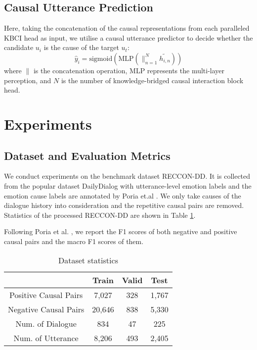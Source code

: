 \documentclass[letterpaper]{article} \usepackage{aaai23}  \usepackage{times}  \usepackage{helvet}  \usepackage{courier}  \usepackage[hyphens]{url}  \usepackage{graphicx} \urlstyle{rm} \def\UrlFont{\rm}  \usepackage{natbib}  \usepackage{caption} \frenchspacing  \setlength{\pdfpagewidth}{8.5in} \setlength{\pdfpageheight}{11in} \usepackage{algorithm}
\begin{document}
\subsection{Causal Utterance Prediction}
Here, taking the concatenation of the causal representations from each paralleled KBCI head as input, we utilise a causal utterance predictor to decide whether the candidate $u_i$ is the cause of the target $u_t$:
\begin{equation}
    \hat{y}_i = \mathrm{sigmoid}(\mathrm{MLP}(\parallel_{n=1}^N \tilde{h_{i,n}}))
\end{equation}
where $\parallel$ is the concatenation operation, MLP represents the multi-layer perception, and $N$ is the number of knowledge-bridged causal interaction block head.

\section{Experiments}
\subsection{Dataset and Evaluation Metrics}
We conduct experiments on the benchmark dataset RECCON-DD. It is collected from the popular dataset DailyDialog \cite{dd} with utterance-level emotion labels and the emotion cause labels are annotated by Poria et.al . We only take causes of the dialogue history into consideration and the repetitive causal pairs are removed. Statistics of the processed RECCON-DD are shown in Table \ref{tab1}.

Following Poria et al. , we report the F1 scores of both negative and positive causal pairs and the macro F1 scores of them.

\begin{table}
\footnotesize
\centering
\begin{tabular}{cccc}
\toprule
& \textbf{Train} & \textbf{Valid} & \textbf{Test} \\
\midrule
Positive Causal Pairs &7,027 &328 &1,767 \\
Negative Causal Pairs &20,646 &838 &5,330 \\
Num. of Dialogue &834 &47 &225 \\
Num. of Utterance &8,206 &493 &2,405\\
\bottomrule
\end{tabular}
\caption{Dataset statistics}
\label{tab1}
\end{table}
\end{document}
